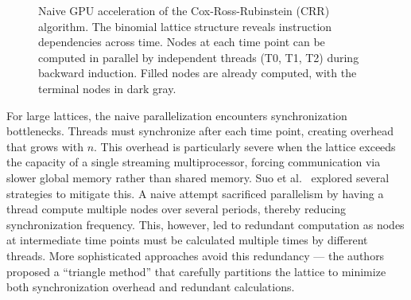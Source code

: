 \documentclass[english,12pt,a4paper,pdftex,sci,utf8]{aaltothesis}
\begin{document}
\begin{figure}[tbp]
    \centering
    \caption{Naive GPU acceleration of the Cox-Ross-Rubinstein (CRR) algorithm. The binomial lattice structure reveals instruction dependencies across time. Nodes at each time point can be computed in parallel by independent threads (T0, T1, T2) during backward induction. Filled nodes are already computed, with the terminal nodes in dark gray.}
    \label{fig:crr-gpu-naive}
\end{figure}

For large lattices, the naive parallelization encounters synchronization bottlenecks. Threads must synchronize after each time point, creating overhead that grows with $n$. This overhead is particularly severe when the lattice exceeds the capacity of a single streaming multiprocessor, forcing communication via slower global memory rather than shared memory. Suo et al.\ \cite{suo2015gpu} explored several strategies to mitigate this. A naive attempt sacrificed parallelism by having a thread compute multiple nodes over several periods, thereby reducing synchronization frequency. This, however, led to redundant computation as nodes at intermediate time points must be calculated multiple times by different threads. More sophisticated approaches avoid this redundancy --- the authors proposed a ``triangle method'' that carefully partitions the lattice to minimize both synchronization overhead and redundant calculations.
\end{document}
